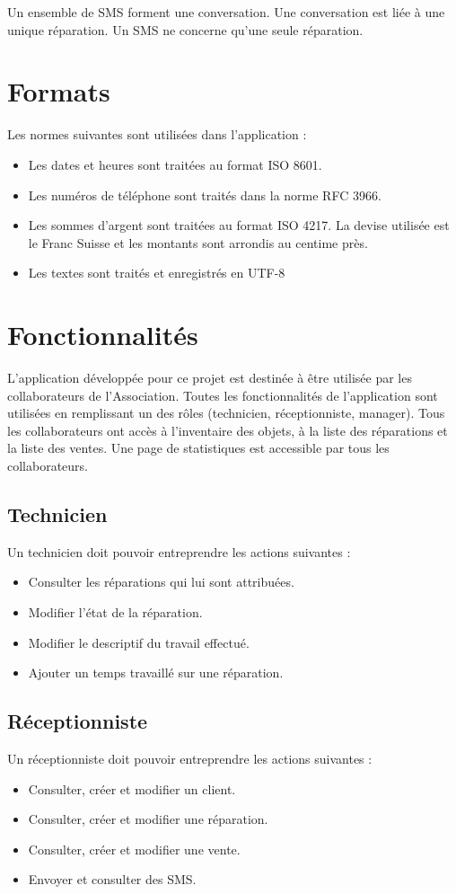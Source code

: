 \documentclass{article}
\begin{document}
Un ensemble de SMS forment une conversation. Une conversation est liée à une unique réparation. Un SMS ne concerne qu'une seule réparation.

\section{Formats}
Les normes suivantes sont utilisées dans l'application :
\begin{itemize}
    \item Les dates et heures sont traitées au format ISO 8601.
    \item Les numéros de téléphone sont traités dans la norme RFC 3966.
    \item Les sommes d'argent sont traitées au format ISO 4217. La devise utilisée est le Franc Suisse et les montants sont arrondis au centime près.
    \item Les textes sont traités et enregistrés en UTF-8
\end{itemize}

\section{Fonctionnalités}
L'application développée pour ce projet est destinée à être utilisée par les collaborateurs de l'Association. Toutes les fonctionnalités de l'application sont utilisées en remplissant un des rôles (technicien, réceptionniste, manager). Tous les collaborateurs ont accès à l'inventaire des objets, à la liste des réparations et la liste des ventes. Une page de statistiques est accessible par tous les collaborateurs.

\subsection*{Technicien}
Un technicien doit pouvoir entreprendre les actions suivantes :
\begin{itemize}
    \item Consulter les réparations qui lui sont attribuées.
    \item Modifier l'état de la réparation.
    \item Modifier le descriptif du travail effectué.
    \item Ajouter un temps travaillé sur une réparation.
\end{itemize}

\subsection*{Réceptionniste}
Un réceptionniste doit pouvoir entreprendre les actions suivantes :
\begin{itemize}
    \item Consulter, créer et modifier un client.
    \item Consulter, créer et modifier une réparation.
    \item Consulter, créer et modifier une vente.
    \item Envoyer et consulter des SMS.
\end{itemize}
\end{document}
